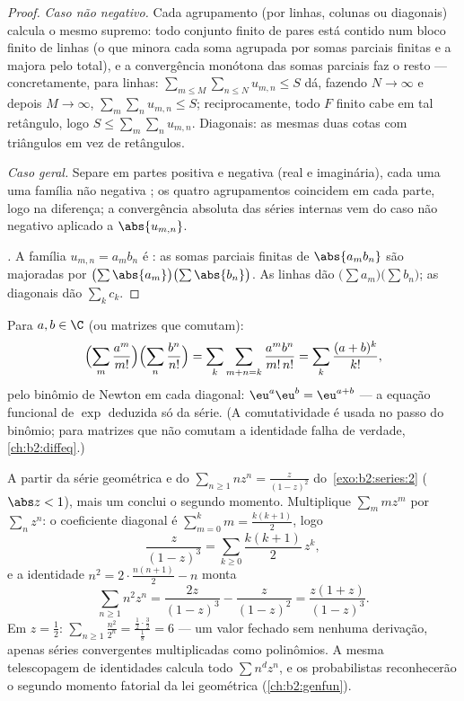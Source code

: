 \begin{proof}
\emph{Caso não negativo.} Cada agrupamento (por linhas, colunas ou
diagonais) calcula o mesmo supremo: todo conjunto finito de pares está
contido num bloco finito de linhas (o que minora cada soma agrupada
por somas parciais finitas e a majora pelo total), e a convergência
monótona das somas parciais faz o resto --- concretamente, para linhas:
$\sum_{m \leq M}\sum_{n \leq N} u_{m,n} \leq S$ dá, fazendo $N
\to \infty$ e depois $M \to \infty$, $\sum_m \sum_n u_{m,n} \leq S$;
reciprocamente, todo $F$ finito cabe em tal retângulo, logo $S \leq
\sum_m\sum_n u_{m,n}$. Diagonais: as mesmas duas cotas com triângulos
em vez de retângulos.

\emph{Caso geral.} Separe em partes positiva e negativa (real e
imaginária), cada uma uma família não negativa ; os quatro
agrupamentos coincidem em cada parte, logo na diferença; a convergência
absoluta das séries internas vem do caso não negativo
aplicado a $\abs{u_{m,n}}$.

\emph{.} A família $u_{m,n} = a_m b_n$ é :
as somas parciais finitas de $\abs{a_mb_n}$ são majoradas por
$\bigl(\sum\abs{a_m}\bigr)\bigl(\sum\abs{b_n}\bigr)$. As linhas dão
$\bigl(\sum a_m\bigr)\bigl(\sum b_n\bigr)$; as diagonais dão $\sum_k
c_k$.
\end{proof}

\begin{example}\label{ex:b2:series:exp}
Para $a, b \in \C$ (ou matrizes que comutam):
\[
\Bigl(\sum_m \frac{a^m}{m!}\Bigr)\Bigl(\sum_n
\frac{b^n}{n!}\Bigr)
= \sum_k \sum_{m+n=k} \frac{a^m b^n}{m!\,n!}
= \sum_k \frac{(a + b)^k}{k!},
\]
pelo binômio de Newton em cada diagonal: $\eu^a \eu^b = \eu^{a+b}$
--- a equação funcional de $\exp$ deduzida só da série.
(A comutatividade é usada no passo do binômio; para matrizes que não comutam
a identidade falha de verdade,
\cref{ch:b2:diffeq}.)
\end{example}

\begin{example}\label{ex:b2:series:squaresum}
A partir da série geométrica e do $\sum_{n
\geq 1} nz^n = \frac{z}{(1-z)^2}$ do~\cref{exo:b2:series:2} ($\abs z < 1$), mais um
 conclui o segundo momento. Multiplique $\sum_m
mz^m$ por $\sum_n z^n$: o coeficiente diagonal é $\sum_{m=0}^k
m = \frac{k(k+1)}2$, logo
\[
\frac{z}{(1-z)^3} = \sum_{k\geq0}\frac{k(k+1)}{2}\,z^k ,
\]
e a identidade $n^2 = 2\cdot\frac{n(n+1)}2 - n$ monta
\[
\sum_{n\geq1} n^2z^n = \frac{2z}{(1-z)^3} - \frac{z}{(1-z)^2}
= \frac{z(1+z)}{(1-z)^3} .
\]
Em $z = \frac12$: $\sum_{n\geq1}\frac{n^2}{2^n} =
\frac{\frac12\cdot\frac32}{\frac18} = 6$ --- um valor fechado sem
nenhuma derivação, apenas séries  convergentes
multiplicadas como polinômios. A mesma telescopagem de identidades
calcula todo $\sum n^dz^n$, e os probabilistas reconhecerão
o segundo momento fatorial da lei geométrica
(\cref{ch:b2:genfun}).
\end{example}


